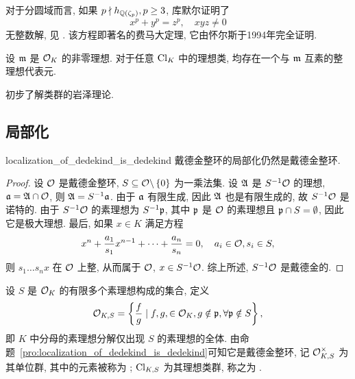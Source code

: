 对于分圆域而言, 如果 $p\nmid h_{{\mathbb{Q}}(\zeta_p)},p\ge 3$, 库默尔证明了
  \[x^p+y^p=z^p,\quad xyz\neq 0\]
无整数解, 见 \cite[Chapter 1]{Lang1990}. 该方程即著名的费马大定理, 它由怀尔斯\cite{TaylorWiles1995, Wiles1995}于1994年完全证明.



\begin{exercise}
设 ${\mathfrak{m}}$ 是 ${\mathcal{O}}_K$ 的非零理想. 对于任意 ${\mathrm{Cl}}_K$ 中的理想类, 均存在一个与 ${\mathfrak{m}}$ 互素的整理想代表元.
\end{exercise}

\begin{exercise}
初步了解类群的岩泽理论.
\end{exercise}


\subsection{局部化}
\begin{proposition}{}{localization_of_dedekind_is_dedekind}
戴德金整环的局部化仍然是戴德金整环.
\end{proposition}
\begin{proof}
设 ${\mathcal{O}}$ 是戴德金整环, $S\subseteq {\mathcal{O}}\backslash\left\{0\right\}$ 为一乘法集. 设 ${\mathfrak{A}}$ 是 $S^{-1}{\mathcal{O}}$ 的理想, ${\mathfrak{a}}={\mathfrak{A}}\cap{\mathcal{O}}$, 则 ${\mathfrak{A}}=S^{-1}{\mathfrak{a}}$. 由于 ${\mathfrak{a}}$ 有限生成, 因此 ${\mathfrak{A}}$ 也是有限生成的, 故 $S^{-1}{\mathcal{O}}$ 是诺特的. 由于 $S^{-1}{\mathcal{O}}$ 的素理想为 $S^{-1}{\mathfrak{p}}$, 其中 ${\mathfrak{p}}$ 是 ${\mathcal{O}}$ 的素理想且 ${\mathfrak{p}}\cap S=\emptyset$, 因此它是极大理想. 最后, 如果 $x\in K$ 满足方程
	\[x^n+\frac{a_1}{s_1}x^{n-1}+\cdots+\frac{a_n}{s_n}=0,\quad a_i\in{\mathcal{O}},s_i\in S,\]
则 $s_1\dots s_n x$ 在 ${\mathcal{O}}$ 上整, 从而属于 ${\mathcal{O}}$, $x\in S^{-1}{\mathcal{O}}$. 综上所述, $S^{-1}{\mathcal{O}}$ 是戴德金的.
\end{proof}


设 $S$ 是 ${\mathcal{O}}_K$ 的有限多个素理想构成的集合, 定义
	\[{\mathcal{O}}_{K,S}=\left\{\frac{f}{g}\mid f,g,\in{\mathcal{O}}_K,g\notin{\mathfrak{p}},\forall {\mathfrak{p}}\notin S\right\},\]
即 $K$ 中分母的素理想分解仅出现 $S$ 的素理想的全体. 由命题~\ref{pro:localization_of_dedekind_is_dedekind}可知它是戴德金整环, 记 ${\mathcal{O}}_{K,S}^\times$ 为其单位群, 其中的元素被称为 ; ${\mathrm{Cl}}_{K,S}$ 为其理想类群, 称之为 .

